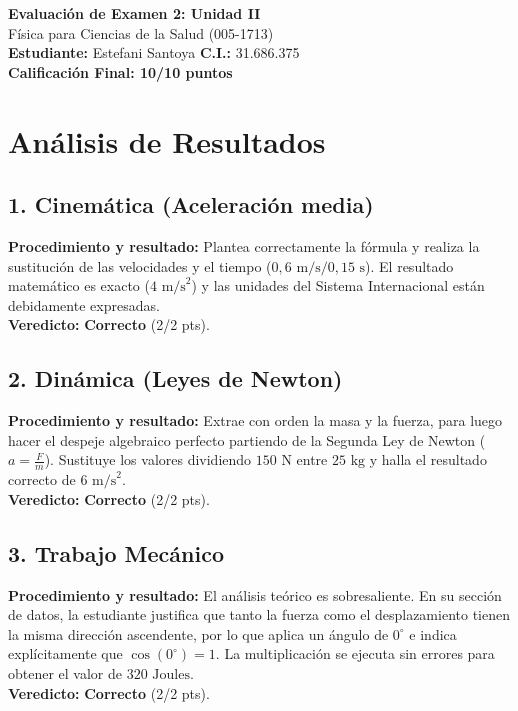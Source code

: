 \documentclass[12pt,letterpaper]{article}
\begin{document}
\begin{center}
    \Large \textbf{Evaluación de Examen 2: Unidad II} \\
    \large Física para Ciencias de la Salud (005-1713) \\
    \vspace{0.5cm}
    \textbf{Estudiante:} Estefani Santoya \quad \textbf{C.I.:} 31.686.375
    \vspace{0.3cm} \\
    \large \textbf{Calificación Final: 10/10 puntos}
\end{center}

\vspace{0.5cm}

\section*{Análisis de Resultados}

\subsection*{1. Cinemática (Aceleración media)}
\textbf{Procedimiento y resultado:} Plantea correctamente la fórmula y realiza la sustitución de las velocidades y el tiempo ($0,6 \text{ m/s} / 0,15 \text{ s}$). El resultado matemático es exacto ($4 \text{ m/s}^2$) y las unidades del Sistema Internacional están debidamente expresadas. \\
\textbf{Veredicto:} \textbf{Correcto} (2/2 pts).

\subsection*{2. Dinámica (Leyes de Newton)}
\textbf{Procedimiento y resultado:} Extrae con orden la masa y la fuerza, para luego hacer el despeje algebraico perfecto partiendo de la Segunda Ley de Newton ($a = \frac{F}{m}$). Sustituye los valores dividiendo $150 \text{ N}$ entre $25 \text{ kg}$ y halla el resultado correcto de $6 \text{ m/s}^2$. \\
\textbf{Veredicto:} \textbf{Correcto} (2/2 pts).

\subsection*{3. Trabajo Mecánico}
\textbf{Procedimiento y resultado:} El análisis teórico es sobresaliente. En su sección de datos, la estudiante justifica que tanto la fuerza como el desplazamiento tienen la misma dirección ascendente, por lo que aplica un ángulo de $0^\circ$ e indica explícitamente que $\cos(0^\circ) = 1$. La multiplicación se ejecuta sin errores para obtener el valor de $320 \text{ Joules}$. \\
\textbf{Veredicto:} \textbf{Correcto} (2/2 pts).
\end{document}
